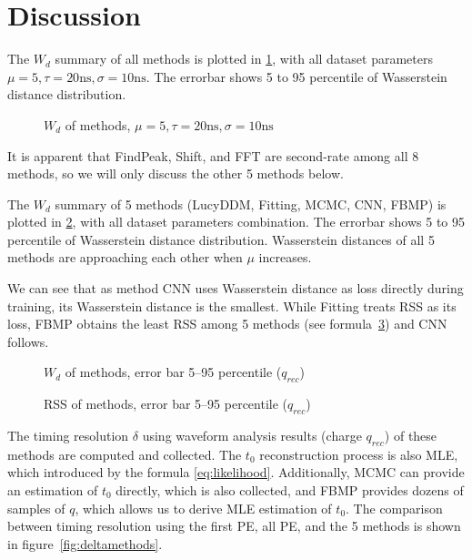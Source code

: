 \section{Discussion} %
\label{sec:discussion}

The $W_{d}$ summary of all methods is plotted in \ref{fig:chargesummary}, with all dataset parameters $\mu=5, \tau=20\mathrm{ns}, \sigma=10\mathrm{ns}$. The errorbar shows 5 to 95 percentile of Wasserstein distance distribution. 

\begin{figure}[H]
    \centering
    \scalebox{0.7}{}
    \caption{\label{fig:chargesummary} $W_{d}$ of methods, $\mu=5, \tau=20\mathrm{ns}, \sigma=10\mathrm{ns}$}
\end{figure}

It is apparent that FindPeak, Shift, and FFT are second-rate among all 8 methods, so we will only discuss the other 5 methods below. 


The $W_{d}$ summary of 5 methods (LucyDDM, Fitting, MCMC, CNN, FBMP) is plotted in \ref{fig:wdistsummary}, with all dataset parameters combination. The errorbar shows 5 to 95 percentile of Wasserstein distance distribution. Wasserstein distances of all 5 methods are approaching each other when $\mu$ increases. 

We can see that as method CNN uses Wasserstein distance as loss directly during training, its Wasserstein distance is the smallest. While Fitting treats RSS as its loss, FBMP obtains the least RSS among 5 methods (see formula~\ref{fig:rsssummary}) and CNN follows. 

\begin{figure}[H]
    \centering
    \resizebox{\textwidth}{!}{}
    \caption{\label{fig:wdistsummary} $W_{d}$ of methods, error bar 5--95 percentile ($q_{rec}$)}
\end{figure}

\begin{figure}[H]
    \centering
    \resizebox{\textwidth}{!}{}
    \caption{\label{fig:rsssummary} RSS of methods, error bar 5--95 percentile ($q_{rec}$)}
\end{figure}

The timing resolution $\delta$ using waveform analysis results (charge $q_{rec}$) of these methods are computed and collected. The $t_{0}$ reconstruction process is also MLE, which introduced by the formula \eqref{eq:likelihood}. Additionally, MCMC can provide an estimation of $t_{0}$ directly, which is also collected, and FBMP provides dozens of samples of $q$, which allows us to derive MLE estimation of $t_{0}$. The comparison between timing resolution using the first PE, all PE, and the 5 methods is shown in figure~\ref{fig:deltamethods}. 

